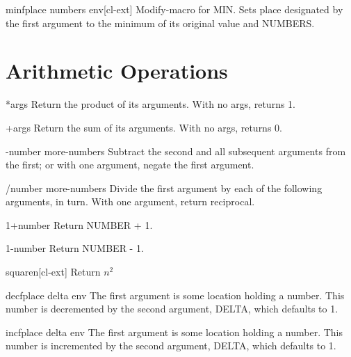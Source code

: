\documentclass[10pt,english]{book}
\begin{document}
\begin{macro}{minf}{place \rest numbers \env env}[cl-ext]
  Modify-macro for MIN. Sets place designated by the first argument to the
minimum of its original value and NUMBERS.
\end{macro}

\section{Arithmetic Operations}
\label{sec:arithm-oper}

\begin{function}{*}{\rest args}
  Return the product of its arguments. With no args, returns 1.
\end{function}

\begin{function}{+}{\rest args}
  Return the sum of its arguments. With no args, returns 0.
\end{function}

\begin{function}{-}{number \rest more-numbers}
  Subtract the second and all subsequent arguments from the first;
  or with one argument, negate the first argument.
\end{function}

\begin{function}{/}{number \rest more-numbers}
  Divide the first argument by each of the following arguments, in turn.
  With one argument, return reciprocal.
\end{function}

\begin{function}{1+}{number}
  Return NUMBER + 1.
\end{function}

\begin{function}{1-}{number}
  Return NUMBER - 1.
\end{function}

\begin{function}{square}{n}[cl-ext]
  Return $n^2$
\end{function}

\begin{macro}{decf}{place \op delta \env env}
  The first argument is some location holding a number. This number is
  decremented by the second argument, DELTA, which defaults to 1.
\end{macro}

\begin{macro}{incf}{place \op delta \env env}
  The first argument is some location holding a number. This number is
  incremented by the second argument, DELTA, which defaults to 1.
\end{macro}
\end{document}
